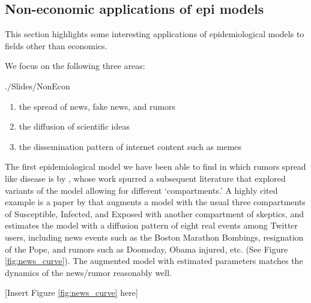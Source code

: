 \subsection{Non-economic applications of epi models}\label{subsec:nonecon}\hypertarget{nonecon}{}

This section highlights some interesting applications of epidemiological models to fields other than economics.

We focus on the following three areas:
\begin{verbatimwrite}{./Slides/NonEcon}
\begin{enumerate}
    \item the spread of news, fake news, and rumors
    \item the diffusion of scientific ideas
    \item the dissemination pattern of internet content such as memes
\end{enumerate}
\end{verbatimwrite}


The first epidemiological model we have been able to find in which rumors spread like disease is by \cite{daley1964epidemics}, whose work spurred a subsequent literature that explored variants of the model allowing for different `compartments.'  A highly cited example is a paper by \cite{jin2013epidemiological} that augments a model with the usual three compartments of Susceptible, Infected, and Exposed with another compartment of skeptics, and estimates the model with a diffusion pattern of eight real events among Twitter users, including news events such as the Boston Marathon Bombings, resignation of the Pope, and rumors such as Doomsday, Obama injured, etc. (See Figure \ref{fig:news_curve}). The augmented model with estimated parameters matches the dynamics of the news/rumor reasonably well.

\begin{center}
	[Insert Figure \ref{fig:news_curve}  here]
		\end{center}

